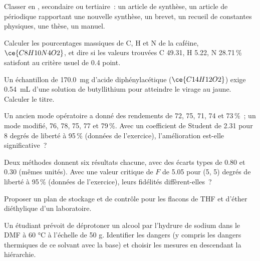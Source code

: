 \begin{exercise}[$\star$]\label{exo:b3:lab-techniques-3:4}
Classer en , secondaire ou tertiaire~: un article de
synthèse, un article de périodique rapportant une nouvelle synthèse, un brevet,
un recueil de constantes physiques, une thèse, un manuel.
\end{exercise}

\begin{exercise}[$\star\star$]\label{exo:b3:lab-techniques-3:5}
Calculer les pourcentages massiques de C, H et N de la caféine, $\ce{C8H10N4O2}$, et dire si les valeurs
trouvées C 49.31, H 5.22, N 28.71\,\% satisfont au critère usuel de 0.4 point.
\end{exercise}

\begin{exercise}[$\star\star$]\label{exo:b3:lab-techniques-3:6}
Un échantillon de \qty{170.0}{mg} d'acide diphénylacétique ($\ce{C14H12O2}$) exige \qty{0.54}{mL} d'une solution de butyllithium pour atteindre
le virage au jaune. Calculer le titre.
\end{exercise}

\begin{exercise}[$\star\star$]\label{exo:b3:lab-techniques-3:7}
Un ancien mode opératoire a donné des rendements de 72, 75, 71, 74 et
73\,\%~; un mode modifié, 76, 78, 75, 77 et 79\,\%. Avec un coefficient de
Student de 2.31 pour 8 degrés de liberté à 95\,\% (données de l'exercice),
l'amélioration est-elle significative~?
\end{exercise}

\begin{exercise}[$\star\star$]\label{exo:b3:lab-techniques-3:8}
Deux méthodes donnent six résultats chacune, avec des écarts types de 0.80
et 0.30 (mêmes unités). Avec une valeur critique de $F$ de 5.05 pour (5, 5) degrés de liberté à 95\,\% (données de
l'exercice), leurs fidélités diffèrent-elles~?
\end{exercise}

\begin{exercise}[$\star\star$]\label{exo:b3:lab-techniques-3:9}
Proposer un plan de stockage et de contrôle pour les flacons de THF et
d'éther diéthylique d'un laboratoire.
\end{exercise}

\begin{exercise}[$\star\star\star$]\label{exo:b3:lab-techniques-3:10}
Un étudiant prévoit de déprotoner un alcool par l'hydrure de sodium dans
le DMF à 60 °C à l'échelle de 50 g. Identifier les dangers (y compris les
dangers thermiques de ce solvant avec la base) et choisir les mesures en
descendant la hiérarchie.
\end{exercise}


